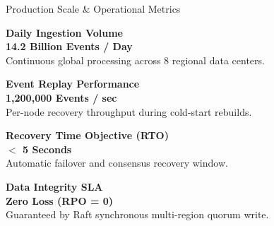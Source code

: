 \documentclass[
  style=simple,
  size=11pt,
  paper=screen,
  orient=landscape
]{powerdot}
\begin{document}
\begin{slide}{Production Scale \& Operational Metrics}
\begin{minipage}{0.48\textwidth}
\begin{tcolorbox}[cardbox]
\small
\textbf{Daily Ingestion Volume}\\[0.3em]
\Large \textbf{14.2 Billion Events / Day}\\[0.2em]
\tiny Continuous global processing across 8 regional data centers.
\end{tcolorbox}
\end{minipage}%
\hfill
\begin{minipage}{0.48\textwidth}
\begin{tcolorbox}[cardbox]
\small
\textbf{Event Replay Performance}\\[0.3em]
\Large \textbf{1,200,000 Events / sec}\\[0.2em]
\tiny Per-node recovery throughput during cold-start rebuilds.
\end{tcolorbox}
\end{minipage}

\vspace{0.8em}
\begin{minipage}{0.48\textwidth}
\begin{tcolorbox}[cardbox]
\small
\textbf{Recovery Time Objective (RTO)}\\[0.3em]
\Large \textbf{$<$ 5 Seconds}\\[0.2em]
\tiny Automatic failover and consensus recovery window.
\end{tcolorbox}
\end{minipage}%
\hfill
\begin{minipage}{0.48\textwidth}
\begin{tcolorbox}[cardbox]
\small
\textbf{Data Integrity SLA}\\[0.3em]
\Large \textbf{Zero Loss (RPO = 0)}\\[0.2em]
\tiny Guaranteed by Raft synchronous multi-region quorum write.
\end{tcolorbox}
\end{minipage}
\end{slide}
\end{document}
